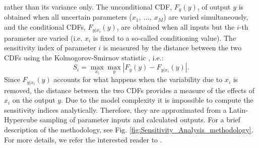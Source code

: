 \documentclass[gmd, manuscript]{copernicus}
\begin{document}
rather than its variance only. The unconditional CDF, $F_y(y)$, of output $y$ is obtained when all uncertain parameters ($x_1,\ ...,\ x_M$) are varied simultaneously, 
and the conditional CDFs, $F_{y|x_i}(y)$, are obtained when all inputs but the $i$-th parameter are varied (i.e. $x_i$ is fixed to a so-called conditioning value). 
The sensitivity index of parameter $i$ is measured by the distance between the two CDFs using the Kolmogorov-Smirnov statistic 
\citep{kolmogorov1933sulla, smirnov1939estimation}, i.e.:
\begin{equation}
 S_i = \max_{x_i} \max_{y} | F_y(y) - F_{y|x_i}(y) |.
\end{equation}
Since $F_{y|x_i}(y)$ accounts for what happens when the variability due to $x_i$ is removed, the distance between the two CDFs provides a measure of the effects of
$x_i$ on the output $y$. 
Due to the model complexity it is impossible to compute the sensitivity indices analytically. Therefore, they are approximated from a Latin-Hypercube sampling of parameter 
inputs and calculated outputs.
For a brief description of the methodology, see Fig. \ref{fig:Sensitivity_Analysis_methodology}. For more details, we refer the interested reader to \citet{pianosi_simple_2015}. 
\end{document}
